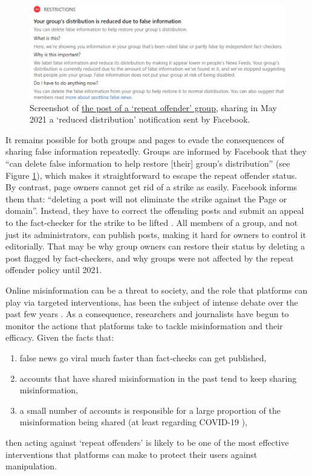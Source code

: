 \documentclass[review]{elsarticle}
\begin{document}
{{\begin{figure}[!h]
\centering
\includegraphics[scale=0.24]{./../figure/screenshot_reduced_group.png}
\caption{
Screenshot of \href{https://www.facebook.com/groups/mcbowwow/posts/3893068180741848/}{the post of a `repeat offender' group}, sharing in May 2021 a `reduced distribution' notification sent by Facebook.
}
\label{screenshot_reduced_group}
\end{figure}

It remains possible for both groups and pages to evade the consequences of sharing false information repeatedly. 
Groups are informed by Facebook that they ``can delete false information to help restore [their] group's distribution'' (see Figure \ref{screenshot_reduced_group}), which makes it straightforward to escape the repeat offender status.
By contrast, page owners cannot get rid of a strike as easily. 
Facebook informs them that: ``deleting a post will not eliminate the strike against the Page or domain''. 
Instead, they have to correct the offending posts and submit an appeal to the fact-checker for the strike to be lifted \cite{FacebookCorrectRating}.
All members of a group, and not just its administrators, can publish posts,  making it hard for owners to control it editorially. 
That may be why group owners can restore their status by deleting a post flagged by fact-checkers, and why groups were not affected by the repeat offender policy until 2021.

Online misinformation can be a threat to society, and the role that platforms can play via targeted interventions, has been the subject of intense debate over the past few years \citep{rogers2020deplatforming}. 
As a consequence, researchers \citep{mena2020cleaning, yaqub2020effects} and journalists \citep{FacebookPartisanBias, FacebookCivilityGrowth} have begun to monitor the actions that platforms take to tackle misinformation and their efficacy.
Given the facts that:
\begin{enumerate}[(1)]
\item false news go viral much faster than fact-checks can get published,
\item accounts that have shared misinformation in the past tend to keep sharing misinformation,
\item a small number of accounts is responsible for a large proportion of the misinformation being shared (at least regarding COVID-19 \citep{disinformationDozen}),
\end{enumerate}
then acting against `repeat offenders' is likely to be one of the most effective interventions that platforms can make to protect their users against manipulation.

}}
\end{document}
